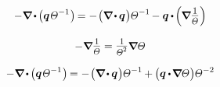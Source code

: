 \begin{equation*}
- \boldnabla \hspace{-0.15ex} \dotp \hspace{-0.15ex} \bigl( \heatfluxvector \hspace{.18ex} \temperaturefield^{-1} \hspace{.1ex} \bigr) \hspace{-0.2ex}
= - \hspace{.16ex} \bigl( \boldnabla \hspace{-0.2ex} \dotp \hspace{-0.1ex} \heatfluxvector \hspace{.1ex} \bigr) \temperaturefield^{-1} \hspace{-0.2ex}
- \heatfluxvector \hspace{-0.1ex} \dotp \hspace{-0.2ex} \Bigl( \hspace{-0.1ex} \boldnabla \raisemath{.1em}{\scalebox{0.83}{$\displaystyle\frac{\raisemath{-0.2em}{1}}{\temperaturefield}$}} \hspace{.1ex} \Bigr)
\end{equation*}

\begin{equation*}
- \boldnabla \raisemath{.1em}{\scalebox{0.83}{$\displaystyle\frac{\raisemath{-0.2em}{1}}{\temperaturefield}$}}
= \raisemath{.1em}{\scalebox{0.83}{$\displaystyle\frac{\raisemath{-0.2em}{1}}{\temperaturefield^2}$}} \boldnabla \temperaturefield
\end{equation*}

\begin{equation*}
- \boldnabla \hspace{-0.15ex} \dotp \hspace{-0.15ex} \bigl( \heatfluxvector \hspace{.18ex} \temperaturefield^{-1} \hspace{.1ex} \bigr) \hspace{-0.2ex}
= - \hspace{.16ex} \bigl( \boldnabla \hspace{-0.2ex} \dotp \hspace{-0.1ex} \heatfluxvector \hspace{.1ex} \bigr) \temperaturefield^{-1} \hspace{-0.15ex}
+ \hspace{-0.1ex} \bigl( \heatfluxvector \hspace{-0.1ex} \dotp \hspace{-0.25ex} \boldnabla \temperaturefield \hspace{.1ex} \bigr) \temperaturefield^{-2}
\end{equation*}

